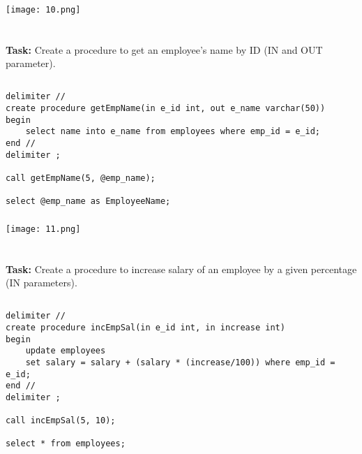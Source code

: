 \documentclass[12pt,a4paper]{article}
\begin{document}
\subsubsection{}
\begin{center}
    \texttt{[image: 10.png]}
\end{center}


\section{}
\textbf{Task:} Create a procedure to get an employee’s name by ID (IN and OUT parameter).

\subsection{}
\begin{lstlisting}
delimiter //
create procedure getEmpName(in e_id int, out e_name varchar(50))
begin
	select name into e_name from employees where emp_id = e_id;
end //
delimiter ;

call getEmpName(5, @emp_name);

select @emp_name as EmployeeName;
\end{lstlisting}

\subsubsection{}
\begin{center}
    \texttt{[image: 11.png]}
\end{center}


\section{}
\textbf{Task:} Create a procedure to increase salary of an employee by a given percentage (IN
parameters).

\subsection{}
\begin{lstlisting}
delimiter //
create procedure incEmpSal(in e_id int, in increase int)
begin
	update employees
    set salary = salary + (salary * (increase/100)) where emp_id = e_id;
end //
delimiter ;

call incEmpSal(5, 10);

select * from employees;
\end{lstlisting}
\end{document}
